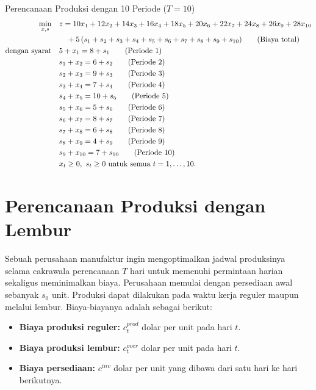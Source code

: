 \begin{examplewithallcode}{Perencanaan Produksi dengan 10 Periode (\(T = 10\))}
\begin{align*}
\min_{x,s} \quad & z = 10x_1 + 12x_2 + 14x_3 + 16x_4 + 18x_5 + 20x_6 + 22x_7 + 24x_8 + 26x_9 + 28x_{10} \\
                 & \quad + 5\,(s_1+s_2+s_3+s_4+s_5+s_6+s_7+s_8+s_9+s_{10})   \tag{Biaya total} \\
\mbox{dengan syarat}\quad        & 5 + x_1 = 8 + s_1   \tag{Periode 1} \\
                 & s_1 + x_2 = 6 + s_2   \tag{Periode 2} \\
                 & s_2 + x_3 = 9 + s_3   \tag{Periode 3} \\
                 & s_3 + x_4 = 7 + s_4   \tag{Periode 4} \\
                 & s_4 + x_5 = 10 + s_5   \tag{Periode 5} \\
                 & s_5 + x_6 = 5 + s_6   \tag{Periode 6} \\
                 & s_6 + x_7 = 8 + s_7   \tag{Periode 7} \\
                 & s_7 + x_8 = 6 + s_8   \tag{Periode 8} \\
                 & s_8 + x_9 = 4 + s_9   \tag{Periode 9} \\
                 & s_9 + x_{10} = 7 + s_{10}   \tag{Periode 10} \\
                 & x_t \geq 0,\ s_t \geq 0 \mbox{ untuk semua } t=1,\dots,10.
\end{align*}
\end{examplewithallcode}

\section*{Perencanaan Produksi dengan Lembur}

Sebuah perusahaan manufaktur ingin mengoptimalkan jadwal produksinya selama cakrawala perencanaan \(T\) hari untuk memenuhi permintaan harian sekaligus meminimalkan biaya. Perusahaan memulai dengan persediaan awal sebanyak \(s_0\) unit. Produksi dapat dilakukan pada waktu kerja reguler maupun melalui lembur. Biaya-biayanya adalah sebagai berikut:
\begin{itemize}
    \item \textbf{Biaya produksi reguler:} \(c^{prod}_t\) dolar per unit pada hari \(t\).
    \item \textbf{Biaya produksi lembur:} \(c^{over}_{t}\) dolar per unit pada hari \(t\).
    \item \textbf{Biaya persediaan:} \(c^{inv}\) dolar per unit yang dibawa dari satu hari ke hari berikutnya.
\end{itemize}

